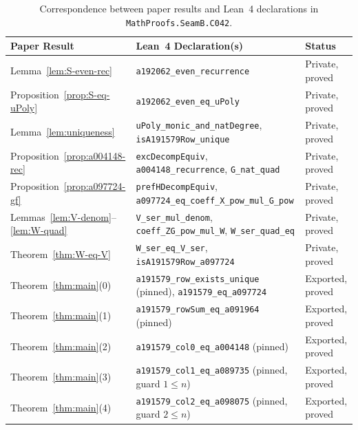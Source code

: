 \documentclass[11pt]{article}
\theoremstyle{definition}
\begin{document}
\begin{table}[ht]
\centering
\caption{Correspondence between paper results and Lean~4 declarations in \texttt{MathProofs.SeamB.C042}.}
\label{tab:lean-map}
\smallskip
{\small
\begin{tabular}{@{}l >{\raggedright\arraybackslash}p{8.2cm} l@{}}
\toprule
Paper Result & Lean~4 Declaration(s) & Status \\
\midrule
Lemma~\ref{lem:S-even-rec} & \texttt{a192062\_even\_recurrence} & Private, proved \\
Proposition~\ref{prop:S-eq-uPoly} & \texttt{a192062\_even\_eq\_uPoly} & Private, proved \\
Lemma~\ref{lem:uniqueness} & \texttt{uPoly\_monic\_and\_natDegree}, \texttt{isA191579Row\_unique} & Private, proved \\
Proposition~\ref{prop:a004148-rec} & \texttt{excDecompEquiv}, \texttt{a004148\_recurrence}, \texttt{G\_nat\_quad} & Private, proved \\
Proposition~\ref{prop:a097724-gf} & \texttt{prefHDecompEquiv}, \texttt{a097724\_eq\_coeff\_X\_pow\_mul\_G\_pow} & Private, proved \\
Lemmas~\ref{lem:V-denom}--\ref{lem:W-quad} & \texttt{V\_ser\_mul\_denom}, \texttt{coeff\_ZG\_pow\_mul\_W}, \texttt{W\_ser\_quad\_eq} & Private, proved \\
Theorem~\ref{thm:W-eq-V} & \texttt{W\_ser\_eq\_V\_ser}, \texttt{isA191579Row\_a097724} & Private, proved \\
Theorem~\ref{thm:main}(0) & \texttt{a191579\_row\_exists\_unique} (pinned), \texttt{a191579\_eq\_a097724} & Exported, proved \\
Theorem~\ref{thm:main}(1) & \texttt{a191579\_rowSum\_eq\_a091964} (pinned) & Exported, proved \\
Theorem~\ref{thm:main}(2) & \texttt{a191579\_col0\_eq\_a004148} (pinned) & Exported, proved \\
Theorem~\ref{thm:main}(3) & \texttt{a191579\_col1\_eq\_a089735} (pinned, guard $1 \le n$) & Exported, proved \\
Theorem~\ref{thm:main}(4) & \texttt{a191579\_col2\_eq\_a098075} (pinned, guard $2 \le n$) & Exported, proved \\
\bottomrule
\end{tabular}
}
\end{table}
\end{document}
